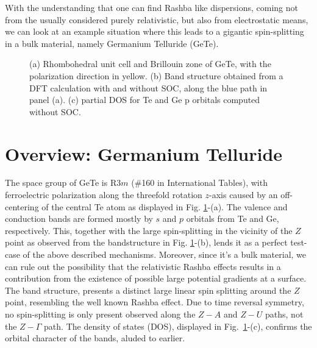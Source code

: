 With the understanding that one can find Rashba like dispersions, coming not from the usually considered purely relativistic, but also from electrostatic means, we can look at an example situation where this leads to a gigantic spin-splitting in a bulk material, namely Germanium Telluride (GeTe).

\begin{figure}[b]
{}
\caption{\label{fig:eigvalsdos}(a) Rhombohedral unit cell and Brillouin zone of GeTe, with the polarization direction in yellow. (b) Band structure obtained from a DFT calculation with and without SOC, along the blue path in panel (a). (c) partial DOS for Te and Ge p orbitals computed without SOC.}
\end{figure}
\section{Overview: Germanium Telluride}
The space group of GeTe is R$3m$ (\#160 in International Tables), with ferroelectric polarization along the threefold rotation $z$-axis caused by an off-centering of the central Te atom \cite{Rabe1987} as displayed in Fig. \ref{fig:eigvalsdos}-(a). The valence and conduction bands are formed mostly by $s$ and $p$ orbitals from Te and Ge, respectively. This, together with the large spin-splitting in the vicinity of the $Z$ point \cite{DiSante2013} as observed from the bandstructure in Fig. \ref{fig:eigvalsdos}-(b), lends it as a perfect test-case of the above described mechanisms. Moreover, since it's a bulk material, we can rule out the possibility that the relativistic Rashba effects results in a contribution from the existence of possible large potential gradients at a surface. The band structure,  presents a distinct large linear spin splitting around the $Z$ point, resembling the well known Rashba effect. Due to time reversal symmetry, no spin-splitting is only present observed along the $Z-A$ and $Z-U$ paths, not the $Z-\Gamma$ path.
The density of states (DOS), displayed in Fig.~\ref{fig:eigvalsdos}-(c), confirms the orbital character of the bands, aluded to earlier.
